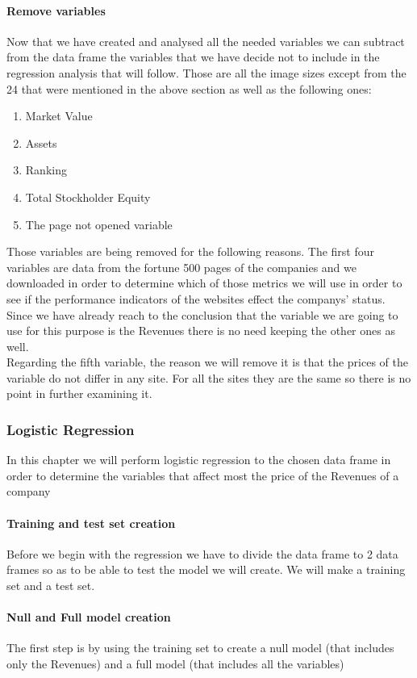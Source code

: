 \documentclass{article}
\begin{document}
\paragraph{Remove variables}
Now that we have created and analysed all the needed variables we can subtract from the data frame the variables that we have decide not to include in the regression analysis that will follow. Those are all the image sizes except from the 24 that were mentioned in the above section as well as the following ones:
\begin{enumerate}
\item Market Value 
\item Assets
\item Ranking
\item Total Stockholder Equity
\item The page not opened variable
\end{enumerate}
Those variables are being removed for the following reasons. The first four variables are data from the fortune 500 pages of the companies and we downloaded in order to determine which of those metrics we will use in order to see if the performance indicators of the websites effect the companys' status. Since we have already reach to the conclusion that the variable we are going to use for this purpose is the Revenues there is no need keeping the other ones as well.\\
Regarding the fifth variable, the reason we will remove it is that the prices of the variable do not differ in any site. For all the sites they are the same so there is no point in further examining it.

\subsubsection{Logistic Regression}
In this chapter we will perform logistic regression to the chosen data frame in order to determine the variables that affect most the price of the Revenues of a company
\paragraph{Training and test set creation}
Before we begin with the regression we have to divide the data frame to 2 data frames so as to be able to test the model we will create. We will make a training set and a test set.
\paragraph{Null and Full model creation}
The first step is by using the training set to create a null model (that includes only the Revenues) and a full model (that includes all the variables)
\end{document}
